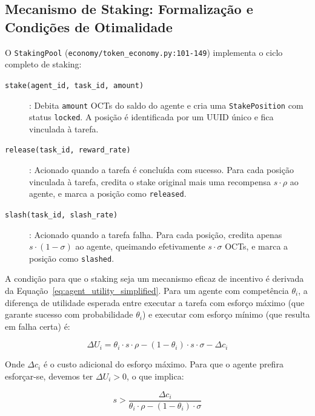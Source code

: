 \subsection{Mecanismo de Staking: Formalização e Condições de Otimalidade}

O \texttt{StakingPool} (\texttt{economy/token\_economy.py:101-149}) implementa o ciclo completo de staking:

\begin{description}
    \item[\texttt{stake(agent\_id, task\_id, amount)}]: Debita \texttt{amount} OCTs do saldo do agente e cria uma \texttt{StakePosition} com status \texttt{locked}. A posição é identificada por um UUID único e fica vinculada à tarefa.
    
    \item[\texttt{release(task\_id, reward\_rate)}]: Acionado quando a tarefa é concluída com sucesso. Para cada posição vinculada à tarefa, credita o stake original mais uma recompensa $s \cdot \rho$ ao agente, e marca a posição como \texttt{released}.
    
    \item[\texttt{slash(task\_id, slash\_rate)}]: Acionado quando a tarefa falha. Para cada posição, credita apenas $s \cdot (1 - \sigma)$ ao agente, queimando efetivamente $s \cdot \sigma$ OCTs, e marca a posição como \texttt{slashed}.
\end{description}

A condição para que o staking seja um mecanismo eficaz de incentivo é derivada da Equação~\eqref{eq:agent_utility_simplified}. Para um agente com competência $\theta_i$, a diferença de utilidade esperada entre executar a tarefa com esforço máximo (que garante sucesso com probabilidade $\theta_i$) e executar com esforço mínimo (que resulta em falha certa) é:

\begin{equation}\label{eq:effort_incentive}
\Delta U_i = \theta_i \cdot s \cdot \rho - (1 - \theta_i) \cdot s \cdot \sigma - \Delta c_i
\end{equation}

Onde $\Delta c_i$ é o custo adicional do esforço máximo. Para que o agente prefira esforçar-se, devemos ter $\Delta U_i > 0$, o que implica:

\begin{equation}\label{eq:minimum_stake}
s > \frac{\Delta c_i}{\theta_i \cdot \rho - (1 - \theta_i) \cdot \sigma}
\end{equation}

